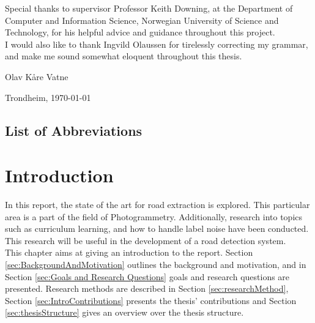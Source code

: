 \documentclass[a4paper]{book}
\newcommand{\thesisAuthor}{Olav Kåre Vatne}
\begin{document}
Special thanks to supervisor Professor Keith Downing, at the Department of Computer
and Information Science, Norwegian University of Science and Technology, for his
helpful advice and guidance throughout this project. \\

I would also like to thank Ingvild Olaussen for tirelessly correcting my grammar, and make me sound somewhat eloquent throughout this thesis.


\vfill

\hfill \thesisAuthor

\hfill Trondheim, \today

\clearpage

\section*{List of Abbreviations}
\vspace{1cm}
\begin{acronym}
\end{acronym}



\tableofcontents

\listoffigures

\listoftables


\mainmatter


\chapter{Introduction}
\label{cha:Introduction}
In this report, the state of the art for road extraction is explored. This particular area is a part of the field of Photogrammetry. Additionally, research into topics such as curriculum learning, and how to handle label noise have been conducted. This research will be useful in the development of a road detection system.\\

This chapter aims at giving an introduction to the report. Section \ref{sec:BackgroundAndMotivation} outlines the background and motivation, and in Section \ref{sec:Goals and Research Questions} goals and research questions are presented. Research methods are described in Section \ref{sec:researchMethod}, Section \ref{sec:IntroContributions} presents the thesis' contributions  and Section \ref{sec:thesisStructure} gives an overview over the thesis structure.
\end{document}
